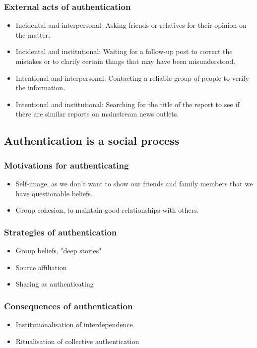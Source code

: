 \documentclass[11pt]{article}
\begin{document}
\subsubsection{External acts of authentication}
\label{sec:orgd1109d3}
\begin{itemize}
\item Incidental and interpersonal: Asking friends or relatives for their opinion on the matter.
\item Incidental and institutional: Waiting for a follow-up post to correct the mistakes or to clarify certain things that may have been misunderstood.
\item Intentional and interpersonal: Contacting a reliable group of people to verify the information.
\item Intentional and institutional: Searching for the title of the report to see if there are similar reports on mainstream news outlets.
\end{itemize}

\subsection{Authentication is a social process}
\label{sec:orga71c652}

\subsubsection{Motivations for authenticating}
\label{sec:org711f417}
\begin{itemize}
\item Self-image, as we don't want to show our friends and family members that we have questionable beliefs.
\item Group cohesion, to maintain good relationships with others.
\end{itemize}

\subsubsection{Strategies of authentication}
\label{sec:org52d0d3a}
\begin{itemize}
\item Group beliefs, "deep stories"
\item Source affiliation
\item Sharing as authenticating
\end{itemize}

\subsubsection{Consequences of authentication}
\label{sec:orgdab53be}
\begin{itemize}
\item Institutionalisation of interdependence
\item Ritualisation of collective authentication
\end{itemize}
\end{document}

